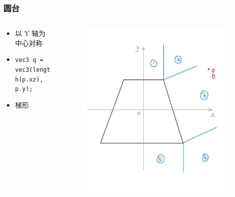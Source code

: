 \documentclass[aspectratio=169]{ctexbeamer} %
\begin{document}
\begin{frame}
    \frametitle{圆台} %
    \begin{columns}
        \begin{column}{.6\textwidth}
            \begin{itemize}
                \item 以 Y 轴为中心对称
                \item \texttt{vec3 q = vec3(length(p.xz), p.y);}
                \item 梯形
            \end{itemize}
        \end{column}
        \begin{column}{.4\textwidth}
            \begin{figure}[htbp]
                \centering
                \includegraphics[height=.65\textheight]{images/pre/cone_derive.pdf}
                \caption{}
                \label{fig:cone_derive}
            \end{figure}
        \end{column}
    \end{columns}
\end{frame}
\end{document}
